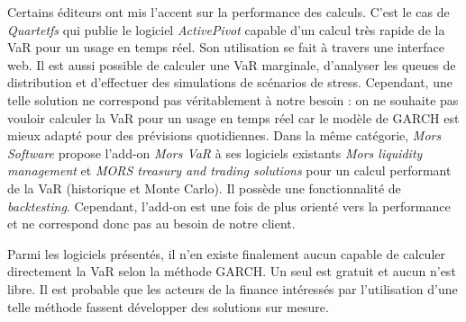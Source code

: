 		Certains éditeurs ont mis l'accent sur la performance des calculs. C'est le cas de \textit{Quartetfs} qui publie le logiciel \textit{ActivePivot} capable d'un calcul très rapide de la VaR pour un usage en temps réel. Son utilisation se fait à travers une interface web. Il est aussi possible de calculer une VaR marginale, d'analyser les queues de distribution et d'effectuer des simulations de scénarios de stress. Cependant, une telle solution ne correspond pas véritablement à notre besoin : on ne souhaite pas vouloir calculer la VaR pour un usage en temps réel car le modèle de GARCH est mieux adapté pour des prévisions quotidiennes.	Dans la même catégorie, \textit{Mors Software} propose l'add-on \textit{Mors VaR} à ses logiciels existants \textit{Mors liquidity management} et \textit{MORS treasury and trading solutions} pour un calcul performant de la VaR (historique et Monte Carlo). Il possède une fonctionnalité de \textit{backtesting}. Cependant, l'add-on est une fois de plus orienté vers la performance et ne correspond donc pas au besoin de notre client.
		\nocite{website:Quartetfs}
		\nocite{website:MorsSoftware}

		Parmi les logiciels présentés, il n'en existe finalement aucun capable de calculer directement la VaR selon la méthode GARCH. Un seul est gratuit et aucun n'est libre. Il est probable que les acteurs de la finance intéressés par l'utilisation d'une telle méthode fassent développer des solutions sur mesure.